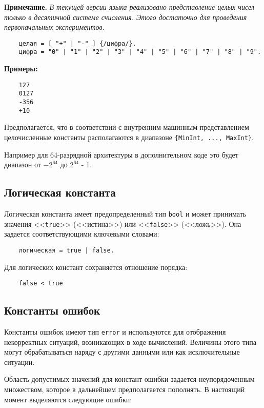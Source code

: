 {\textbf{Примечание.}
\textit{В текущей версии языка реализовано представление целых чисел только в десятичной системе счисления. Этого достаточно для проведения первоначальных экспериментов.}

\begin{verbatim}
    целая = [ "+" | "-" ] {/цифра/}.
    цифра = "0" | "1" | "2" | "3" | "4" | "5" | "6" | "7" | "8" | "9".
\end{verbatim}

\textbf{Примеры:}

\begin{verbatim}
    127
    0127
    -356
    +10
\end{verbatim}

Предполагается, что в соответствии с внутренним машинным представлением целочисленные константы располагаются в диапазоне \verb|{MinInt, ..., MaxInt}|.

Например для 64-разрядной архитектуры в дополнительном коде это будет диапазон от $-2^{64}$ до $2^{64}$ - 1.

\subsection{Логическая константа}
\label{smile:const:bool}

Логическая константа имеет предопределенный тип \verb|bool| и может принимать значения <<\verb|true|>> (<<истина>>) или <<\verb|false|>> (<<ложь>>). Она задается соответствующими ключевыми словами:

\begin{verbatim}
    логическая = true | false.
\end{verbatim}
Для логических констант сохраняется отношение порядка:

\begin{verbatim}
    false < true
\end{verbatim}

\subsection{Константы ошибок}
\label{smile:const:err}

Константы ошибок имеют тип \verb|error| и используются для отображения некорректных ситуаций, возникающих в ходе вычислений. Величины этого типа могут обрабатываться наряду с другими данными или как исключительные ситуации.

Область допустимых значений для констант ошибки задается неупорядоченным множеством, которое в дальнейшем предполагается пополнять. В настоящий момент выделяются следующие ошибки:

}
